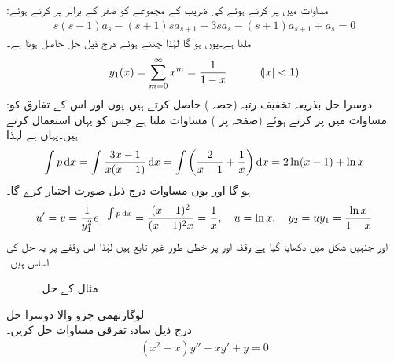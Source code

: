 :مساوات  میں  پر کرتے  ہوئے  کی  ضریب  کے مجموعے کو صفر کے برابر پر کرتے ہوئے
\begin{align*}
s(s-1)a_s-(s+1)sa_{s+1}+3sa_s-(s+1)a_{s+1}+a_s=0
\end{align*}
 ملتا ہے۔یوں  ہو گا لہٰذا  چنتے ہوئے درج ذیل حل حاصل ہوتا ہے۔
\begin{align*}
y_1(x)=\sum_{m=0}^{\infty} x^m=\frac{1}{1-x}\quad \quad \quad (\abs{x} <1)
\end{align*}
:دوسرا حل بذریعہ تخفیف رتبہ (حصہ ) حاصل کرتے ہیں۔یوں  اور اس کے تفارق کو مساوات میں پر کرتے ہوئے (صفحہ  پر ) مساوات  ملتا ہے جس  کو یہاں استعمال کرتے ہیں۔یہاں  ہے لہٰذا
\begin{align*}
\int p\dif x=\int \frac{3x-1}{x(x-1)}\dif x=\int \left(\frac{2}{x-1}+\frac{1}{x}\right)\dif x=2\ln(x-1)+\ln x
\end{align*}
ہو گا اور یوں مساوات  درج ذیل صورت اختیار کرے گا۔
 \begin{align*}
u'=v=\frac{1}{y_1^2}e^{-\int p \dif x}=\frac{(x-1)^2}{(x-1)^2x}=\frac{1}{x}, \quad u=\ln x, \quad y_2=uy_1=\frac{\ln x}{1-x}
\end{align*}
 اور  جنہیں شکل میں دکھایا گیا ہے وقفہ  اور  پر خطی طور غیر تابع ہیں لہٰذا اس وقفے پر یہ حل کی اساس ہیں۔
\begin{figure}
\centering
{}
\caption{مثال  کے حل۔}
\label{شکل_مثال_بیسل_دوسری_صورت_دوہرا_حل}
\end{figure} 
\quad لوگارتھمی جزو والا دوسرا حل\\
درج ذیل سادہ تفرقی مساوات حل کریں۔
\begin{align}\label{مساوات_بیسل_لوگارتھمی_جزو_الف}
(x^2-x)y''-xy'+y=0
\end{align}

